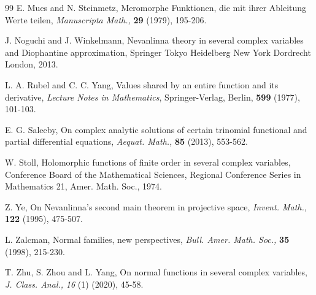 \documentclass[11pt, reqno]{amsart}
\newtheorem*{cor A}{Corollary A}
\newtheorem*{cor B}{Corollary B}
\numberwithin{equation}{section}
\begin{document}
\begin{thebibliography}{99}
 {\sc E. Mues} and {\sc N. Steinmetz}, Meromorphe Funktionen, die mit ihrer Ableitung Werte teilen, \textit{Manuscripta Math.,} \textbf{29} (1979), 195-206.

 {\sc J. Noguchi} and {\sc J. Winkelmann}, Nevanlinna theory in several complex variables and Diophantine approximation, Springer Tokyo Heidelberg New York Dordrecht London, 2013.

 {\sc L. A. Rubel} and {\sc C. C. Yang}, Values shared by an entire function and its derivative, \textit{Lecture Notes in Mathematics}, Springer-Verlag, Berlin, \textbf{599} (1977), 101-103.

 {\sc E. G. Saleeby}, On complex analytic solutions of certain trinomial functional and partial differential equations, \textit{Aequat. Math.,} \textbf{85} (2013), 553-562.

 {\sc W. Stoll}, Holomorphic functions of finite order in several complex variables, Conference Board of the Mathematical Sciences, Regional Conference Series in Mathematics 21, Amer. Math. Soc., 1974.

 {\sc Z. Ye}, On Nevanlinna's second main theorem in projective space, \textit{Invent. Math.,} \textbf{122} (1995), 475-507.

 {\sc L. Zalcman}, Normal families, new perspectives, \textit{Bull. Amer. Math. Soc.,} \textbf{35} (1998), 215-230.

 {\sc T. Zhu}, {\sc S. Zhou} and {\sc L. Yang}, On normal functions in several complex variables, \textit{J. Class. Anal.,} \textit{16} (1) (2020), 45-58.

\end{thebibliography}
\end{document}
